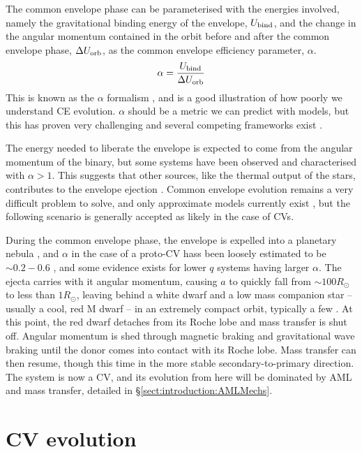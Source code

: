The common envelope phase can be parameterised with the energies involved, namely the gravitational binding energy of the envelope, $U_{\rm bind}$, and the change in the angular momentum contained in the orbit before and after the common envelope phase, $\Delta U_{\rm orb}$, as the common envelope efficiency parameter, $\alpha$.
\begin{equation}
    \alpha = \frac{U_{\rm bind}}{\Delta U_{\rm orb}}
\end{equation}
This is known as the $\alpha$ formalism \citep{demarco2011}, and is a good illustration of how poorly we understand CE evolution. $\alpha$ should be a metric we can predict with models, but this has proven very challenging and several competing frameworks exist \citep{ivanova2020}. 

The energy needed to liberate the envelope is expected to come from the angular momentum of the binary, but some systems have been observed and characterised with $\alpha > 1$. This suggests that other sources, like the thermal output of the stars, contributes to the envelope ejection \citep{demarco2011, ivanova2013}. Common envelope evolution remains a very difficult problem to solve, and only approximate models currently exist \citep{ivanova2020}, but the following scenario is generally accepted as likely in the case of CVs.

During the common envelope phase, the envelope is expelled into a planetary nebula \citep{Ritter2012}, and $\alpha$ in the case of a proto-CV hass been loosely estimated to be $\sim 0.2 - 0.6$ \citep{politano2007}, and some evidence exists for lower $q$ systems having larger $\alpha$\citep{passy2013}. The ejecta carries with it angular momentum, causing $a$ to quickly fall from $\sim 100 R_\odot$ to less than $1 R_\odot$, leaving behind a white dwarf and a low mass companion star -- usually a cool, red M dwarf -- in an extremely compact orbit, typically a few \Rsun. At this point, the red dwarf detaches from its Roche lobe and mass transfer is shut off. Angular momentum is shed through magnetic braking and gravitational wave braking until the donor comes into contact with its Roche lobe. Mass transfer can then resume, though this time in the more stable secondary-to-primary direction. The system is now a CV, and its evolution from here will be dominated by AML and mass transfer, detailed in \S\ref{sect:introduction:AMLMechs}.


\section{CV evolution}
\label{sect:introduction:Summary of how AML and Mdot drive period evolution}

